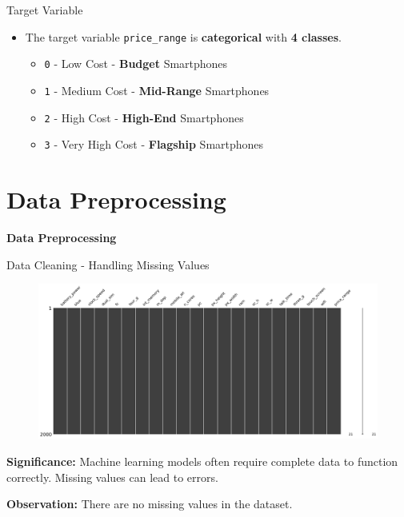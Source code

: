 \documentclass[14pt, aspectratio=169]{beamer}
\begin{document}
\begin{frame}{Target Variable}
  \begin{itemize}
  \setlength\itemsep{0.5em}
  \item The target variable \texttt{price\_range} is \textbf{categorical} with \textbf{4 classes}.
  \begin{itemize}
  \setlength\itemsep{0.25em} \small
      \item \texttt{0} - Low Cost - \textbf{Budget} Smartphones
      \item \texttt{1} - Medium Cost - \textbf{Mid-Range} Smartphones
      \item \texttt{2} - High Cost - \textbf{High-End} Smartphones
      \item \texttt{3} - Very High Cost - \textbf{Flagship} Smartphones 
    \end{itemize}
    \normalsize
  \end{itemize}
\end{frame}

\section{Data Preprocessing}
\begin{frame}{}
  \Huge
  \centering
  \textbf{Data Preprocessing}
  \normalsize
\end{frame}

\begin{frame}[allowframebreaks]{Data Cleaning - Handling Missing Values}
  \begin{figure}[H]
    \centering
    \includegraphics[height=0.3\textwidth]{missing_val.png}
  \end{figure}
  \begin{minipage}{0.475\textwidth}
    \begin{block}{}
      \textbf{Significance:} \small
      Machine learning models often require complete data to function correctly. Missing values can lead to errors.
    \end{block}
  \end{minipage}
  \hfill
  \begin{minipage}{0.475\textwidth}
    \begin{block}{}
      \textbf{Observation:} \small
      There are no missing values in the dataset.
    \end{block}
  \end{minipage}
\end{frame}
\end{document}
